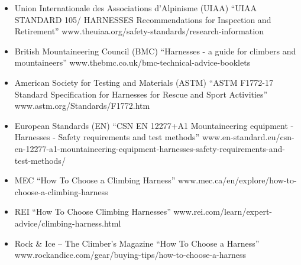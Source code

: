 \documentclass[nonacm,acmtog,authordraft]{acmart}
\begin{document}
  \begin{itemize}
  \item Union Internationale des Associations d’Alpinisme (UIAA) ``UIAA
    STANDARD 105/ HARNESSES Recommendations for Inspection and Retirement''
    www.theuiaa.org/safety-standards/research-information
  \item British Mountaineering Council (BMC) ``Harnesses - a guide for climbers
    and mountaineers'' www.thebmc.co.uk/bmc-technical-advice-booklets
  \item American Society for Testing and Materials (ASTM) ``ASTM F1772-17
    Standard Specification for Harnesses for Rescue and Sport Activities''
    www.astm.org/Standards/F1772.htm
  \item European Standards (EN) ``CSN EN 12277+A1 Mountaineering equipment -
    Harnesses - Safety requirements and test methods''
    www.en-standard.eu/csn-en-12277-a1-mountaineering-equipment-harnesses-safety-requirements-and-test-methods/
  \item MEC ``How To Choose a Climbing Harness''
    www.mec.ca/en/explore/how-to-choose-a-climbing-harness
  \item REI ``How To Choose Climbing Harnesses''
    www.rei.com/learn/expert-advice/climbing-harness.html
  \item Rock \& Ice – The Climber’s Magazine ``How To Choose a Harness''
    www.rockandice.com/gear/buying-tips/how-to-choose-a-harness
  \end{itemize}


%
%
\end{document}
